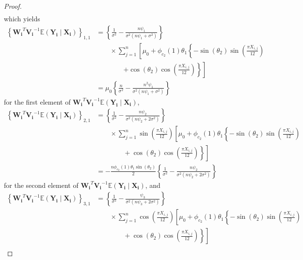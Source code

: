 \begin{proof}
\begin{align}
\end{align}
which yields
\begin{align*}
    \left\{\boldsymbol{W_i}^T\boldsymbol{V_i}^{-1}\mathbb{E}(\boldsymbol{Y_i}\mid \boldsymbol{X_i})\right\}_{1,1} &= \left\{\frac{1}{\sigma^2} - \frac{n\psi_1}{\sigma^2(n\psi_1+\sigma^2)}\right\} \\
    & \quad \quad \times \sum_{j=1}^n\left[ \mu_0  + \phi_{c_2}(1)\theta_1\left\{- \sin(\theta_2)\sin\left(\frac{\pi X_{i,j}}{12} \right) \right. \right.  \\
    & \quad \quad \quad \quad \left. \left. + \cos(\theta_2)\cos\left(\frac{\pi X_{i,j}}{12} \right)\right\}\right] \\
    &= \mu_0\left\{\frac{n}{\sigma^2} - \frac{n^2\psi_1}{\sigma^2(n\psi_1+\sigma^2)}\right\}
\end{align*}
for the first element of $\boldsymbol{W_i}^T\boldsymbol{V_i}^{-1}\mathbb{E}(\boldsymbol{Y_i}\mid \boldsymbol{X_i})$,
\begin{align*}
    \left\{\boldsymbol{W_i}^T\boldsymbol{V_i}^{-1}\mathbb{E}(\boldsymbol{Y_i}\mid \boldsymbol{X_i})\right\}_{2,1} &= \left\{\frac{1}{\sigma^2} - \frac{n\psi_2}{\sigma^2(n\psi_2+2\sigma^2)}\right\} \\
    & \quad \quad \times \sum_{j=1}^n\sin\left(\frac{\pi X_{i,j}}{12}\right)\left[ \mu_0 + \phi_{c_2}(1)\theta_1\left\{- \sin(\theta_2)\sin\left(\frac{\pi X_{i,j}}{12} \right) \right. \right. \\
    &\left. \left. \quad \quad \quad \quad + \cos(\theta_2)\cos\left(\frac{\pi X_{i,j}}{12} \right)\right\} \right] \\
    &= -\frac{n\phi_{c_2}(1)\theta_1\sin(\theta_2)}{2}\left\{\frac{1}{\sigma^2} - \frac{n\psi_2}{\sigma^2(n\psi_2+2\sigma^2)}\right\}
\end{align*}
for the second element of $\boldsymbol{W_i}^T\boldsymbol{V_i}^{-1}\mathbb{E}(\boldsymbol{Y_i}\mid \boldsymbol{X_i})$, and
\begin{align*}
    \left\{\boldsymbol{W_i}^T\boldsymbol{V_i}^{-1}\mathbb{E}(\boldsymbol{Y_i}\mid \boldsymbol{X_i})\right\}_{3,1} &= \left\{\frac{1}{\sigma^2} - \frac{\psi_3}{\sigma^2(n\psi_3+2\sigma^2)}\right\} \\
    & \quad \quad \times \sum_{j=1}^n\cos\left(\frac{\pi X_{i,j}}{12}\right)\left[ \mu_0 + \phi_{c_2}(1)\theta_1\left\{- \sin(\theta_2)\sin\left(\frac{\pi X_{i,j}}{12} \right) \right. \right. \\
    &\left. \left. \quad \quad \quad \quad + \cos(\theta_2)\cos\left(\frac{\pi X_{i,j}}{12} \right)\right\} \right] \\

\end{align*}
\end{proof}
